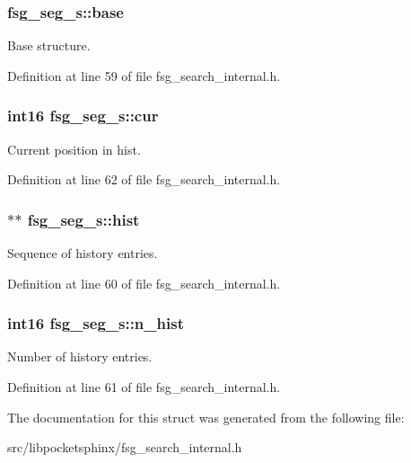 \subsubsection[{base}]{ fsg\-\_\-seg\-\_\-s\-::base}\label{structfsg__seg__s_a9f977be4814ec887aadb3cea35f96bab}


Base structure. 



Definition at line 59 of file fsg\-\_\-search\-\_\-internal.\-h.

\subsubsection[{cur}]{\setlength{\rightskip}{0pt plus 5cm}int16 fsg\-\_\-seg\-\_\-s\-::cur}\label{structfsg__seg__s_a4b5e46bf79915c97845974e80355ebbe}


Current position in hist. 



Definition at line 62 of file fsg\-\_\-search\-\_\-internal.\-h.

\subsubsection[{hist}]{$\ast$$\ast$ fsg\-\_\-seg\-\_\-s\-::hist}\label{structfsg__seg__s_ae41fbe837c6c921133c91453c58ba68e}


Sequence of history entries. 



Definition at line 60 of file fsg\-\_\-search\-\_\-internal.\-h.

\subsubsection[{n\-\_\-hist}]{\setlength{\rightskip}{0pt plus 5cm}int16 fsg\-\_\-seg\-\_\-s\-::n\-\_\-hist}\label{structfsg__seg__s_aca806a5b88f77803fff4c4c984034515}


Number of history entries. 



Definition at line 61 of file fsg\-\_\-search\-\_\-internal.\-h.



The documentation for this struct was generated from the following file\-:\begin{DoxyCompactItemize}
\item 
src/libpocketsphinx/fsg\-\_\-search\-\_\-internal.\-h\end{DoxyCompactItemize}
